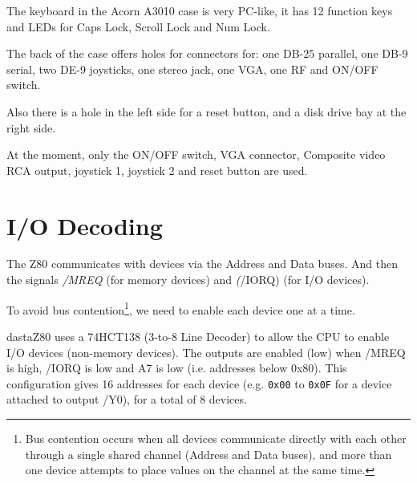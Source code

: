 \documentclass[a4paper,11pt]{article}
\begin{document}
    The keyboard in the Acorn A3010 case is very PC-like, it has 12 function
    keys and LEDs for Caps Lock, Scroll Lock and Num Lock.

    The back of the case offers holes for connectors for: one DB-25 parallel, 
    one DB-9 serial, two DE-9 joysticks, one stereo jack, one VGA, one RF and
    ON/OFF switch.

    Also there is a hole in the left side for a reset button, and a disk drive
    bay at the right side.

    At the moment, only the ON/OFF switch, VGA connector, Composite video RCA
    output, joystick 1, joystick 2 and reset button are used.

    \pagebreak
    \section{I/O Decoding}

    The Z80 communicates with devices via the Address and Data buses. And then
    the signals \textit{/MREQ} (for memory devices) and \textit(/IORQ) (for I/O
    devices).

    To avoid bus contention\footnote{Bus contention occurs when all devices
    communicate directly with each other through a single shared channel
    (Address and Data buses), and more than one device attempts to place values
    on the channel at the same time.}, we need to enable each device one at a
    time.

    dastaZ80 uses a 74HCT138 (3-to-8 Line Decoder) to allow the CPU to enable
    I/O devices (non-memory devices). The outputs are enabled (low) when /MREQ
    is high, /IORQ is low and A7 is low (i.e. addresses below 0x80). This
    configuration gives 16 addresses for each device (e.g. \texttt{0x00} to
    \texttt{0x0F} for a device attached to output /Y0), for a total of 8 devices.
\end{document}
